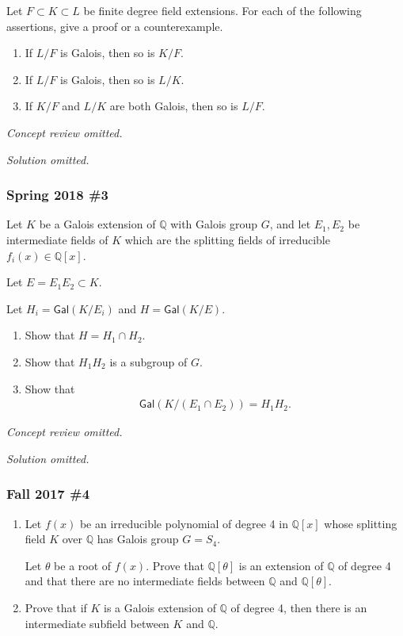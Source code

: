 Let \(F \subset K \subset L\) be finite degree field extensions. For
each of the following assertions, give a proof or a counterexample.

\begin{enumerate}
\def\labelenumi{\alph{enumi}.}
\item
  If \(L/F\) is Galois, then so is \(K/F\).
\item
  If \(L/F\) is Galois, then so is \(L/K\).
\item
  If \(K/F\) and \(L/K\) are both Galois, then so is \(L/F\).
\end{enumerate}

\emph{Concept review omitted.}

\emph{Solution omitted.}

\hypertarget{spring-2018-3}{%
\subsubsection{Spring 2018 \#3}\label{spring-2018-3}}

Let \(K\) be a Galois extension of \({\mathbb{Q}}\) with Galois group
\(G\), and let \(E_1 , E_2\) be intermediate fields of \(K\) which are
the splitting fields of irreducible \(f_i (x) \in {\mathbb{Q}}[x]\).

Let \(E = E_1 E_2 \subset K\).

Let \(H_i = { \mathsf{Gal}} (K/E_i)\) and \(H = { \mathsf{Gal}} (K/E)\).

\begin{enumerate}
\def\labelenumi{\alph{enumi}.}
\item
  Show that \(H = H_1 \cap H_2\).
\item
  Show that \(H_1 H_2\) is a subgroup of \(G\).
\item
  Show that
  \begin{align*}
  { \mathsf{Gal}} (K/(E_1 \cap E_2 )) = H_1 H_2
  .\end{align*}
\end{enumerate}

\emph{Concept review omitted.}

\emph{Solution omitted.}

\hypertarget{fall-2017-4}{%
\subsubsection{Fall 2017 \#4}\label{fall-2017-4}}

\begin{enumerate}
\def\labelenumi{\alph{enumi}.}
\item
  Let \(f (x)\) be an irreducible polynomial of degree 4 in
  \({\mathbb{Q}}[x]\) whose splitting field \(K\) over \({\mathbb{Q}}\)
  has Galois group \(G = S_4\).

  Let \(\theta\) be a root of \(f(x)\). Prove that
  \({\mathbb{Q}}[\theta]\) is an extension of \({\mathbb{Q}}\) of degree
  4 and that there are no intermediate fields between \({\mathbb{Q}}\)
  and \({\mathbb{Q}}[\theta]\).
\item
  Prove that if \(K\) is a Galois extension of \({\mathbb{Q}}\) of
  degree 4, then there is an intermediate subfield between \(K\) and
  \({\mathbb{Q}}\).
\end{enumerate}

